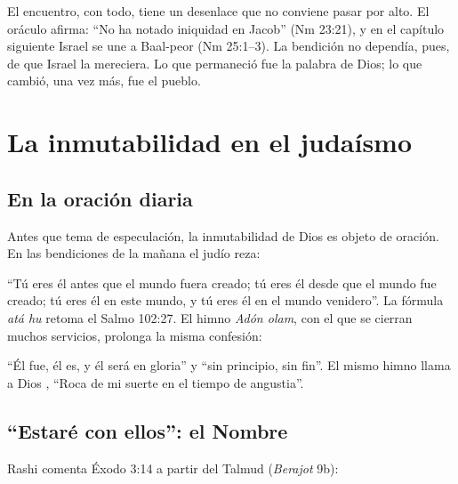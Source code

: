 El encuentro, con todo, tiene un desenlace que no conviene pasar por alto. El oráculo afirma: ``No ha notado iniquidad en Jacob'' (Nm 23:21), y en el capítulo siguiente Israel se une a Baal-peor (Nm 25:1--3). La bendición no dependía, pues, de que Israel la mereciera. Lo que permaneció fue la palabra de Dios; lo que cambió, una vez más, fue el pueblo.


\section{La inmutabilidad en el judaísmo}


\subsection{En la oración diaria}
Antes que tema de especulación, la inmutabilidad de Dios es objeto de oración. En las bendiciones de la mañana el judío reza:


``Tú eres él antes que el mundo fuera creado; tú eres él desde que el mundo fue creado; tú eres él en este mundo, y tú eres él en el mundo venidero''. La fórmula \emph{atá hu} retoma el Salmo 102:27. El himno \emph{Adón olam}, con el que se cierran muchos servicios, prolonga la misma confesión:


\noindent``Él fue, él es, y él será en gloria'' y ``sin principio, sin fin''. El mismo himno llama a Dios , ``Roca de mi suerte en el tiempo de angustia''.

\subsection{“Estaré con ellos”: el Nombre}
Rashi comenta Éxodo 3:14 a partir del Talmud (\emph{Berajot} 9b):

